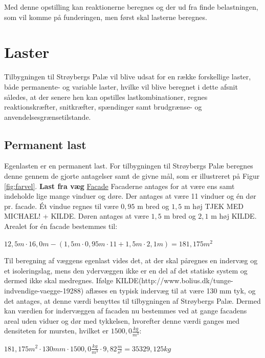 Med denne opstilling kan reaktionerne beregnes og der ud fra finde belastningen, som vil komme på funderingen, men først skal lasterne beregnes.

\section{Laster}
Tilbygningen til Strøybergs Palæ vil blive udsat for en række forskellige laster, både permanente- og variable laster, hvilke vil blive beregnet i dette afsnit således, at der senere hen kan opstilles lastkombinationer, regnes reaktionskræfter, snitkræfter, spændinger samt brudgrænse- og anvendelsesgrænsetilstande.

\subsection{Permanent last}
Egenlasten er en permanent last. For tilbygningen til Strøybergs Palæ beregnes denne gennem de gjorte antagelser samt de givne mål, som er illustreret på Figur \ref{fig:farvel}.
\newline
\newline
\textbf{Last fra væg}
\newline
\newline
\underline{Facade}
\newline
Facaderne antages for at være ens samt indeholde lige mange vinduer og døre. Der antages at være 11 vinduer og én dør pr. facade. 
\newline \indent{     }  Ét vindue regnes til være $0,\!95$ m bred og $1,\!5$ m høj TJEK MED MICHAEL! + KILDE. Døren antages at være $1,\!5$ m bred og $2,\!1$ m høj KILDE. Arealet for én facade bestemmes til:
\begin{center}
	$12,\!5 m\cdot 16,\!0 m - (1,\!5 m\cdot0,\!95 m\cdot11 + 1,\!5 m\cdot 2,\!1 m)=181,\!175 m^2$
\end{center}

Til beregning af væggens egenlast vides det, at der skal påregnes en indervæg og et isoleringslag, mens den ydervæggen ikke er en del af det statiske system og dermed ikke skal medregnes.
\newline \indent{     }  Ifølge KILDE(http://www.bolius.dk/tunge-indvendige-vaegge-19288) aflæses en typisk indervæg til at være 130 mm tyk, og det antages, at denne værdi benyttes til tilbygningen af Strøybergs Palæ. Dermed kan værdien for indervæggen af facaden nu bestemmes ved at gange facadens areal uden viduer og dør med tykkelsen, hvorefter denne værdi ganges med densiteten for mursten, hvilket er $1500,\!0 \frac{kg}{m^3}$:
\begin{center}
	$181,\!175 m^2\cdot 130 mm\cdot 1500,\!0 \frac{kg}{m^3}\cdot 9,\!82 \frac{m}{s^2}=35329,\!125 kg$
\end{center}

